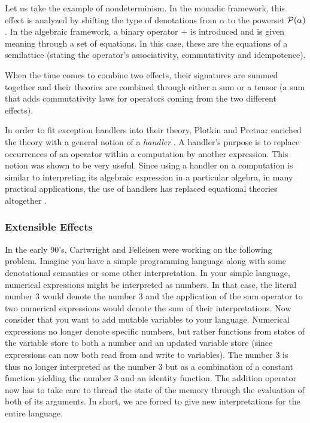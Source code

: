 Let us take the example of nondeterminism. In the monadic framework, this
effect is analyzed by shifting the type of denotations from $\alpha$ to the
powerset $\mathcal{P}(\alpha)$. In the algebraic framework, a binary
operator $+$ is introduced and is given meaning through a set of equations.
In this case, these are the equations of a semilattice (stating the
operator's associativity, commutativity and idempotence).

When the time comes to combine two effects, their signatures are summed
together and their theories are combined through either a sum or a tensor
(a sum that adds commutativity laws for operators coming from the two
different effects).

In order to fit exception handlers into their theory, Plotkin and Pretnar
enriched the theory with a general notion of a \emph{handler}
\cite{plotkin2013handling}. A handler's purpose is to replace occurrences
of an operator within a computation by another expression. This notion was
shown to be very useful. Since using a handler on a computation is similar
to interpreting its algebraic expression in a particular algebra, in many
practical applications, the use of handlers has replaced equational
theories altogether
\cite{bauer2012programming,kammar2013handlers,brady2013programming}.

\subsubsection*{Extensible Effects}

In the early 90's, Cartwright and Felleisen were working on the following
problem. Imagine you have a simple programming language along with some
denotational semantics or some other interpretation. In your simple
language, numerical expressions might be interpreted as numbers. In that
case, the literal number 3 would denote the number 3 and the application of
the sum operator to two numerical expressions would denote the sum of their
interpretations. Now consider that you want to add mutable variables to
your language. Numerical expressions no longer denote specific numbers, but
rather functions from states of the variable store to both a number and an
updated variable store (since expressions can now both read from and write
to variables). The number 3 is thus no longer interpreted as the number 3
but as a combination of a constant function yielding the number 3 and an
identity function. The addition operator now has to take care to thread the
state of the memory through the evaluation of both of its arguments. In
short, we are forced to give new interpretations for the entire language.

